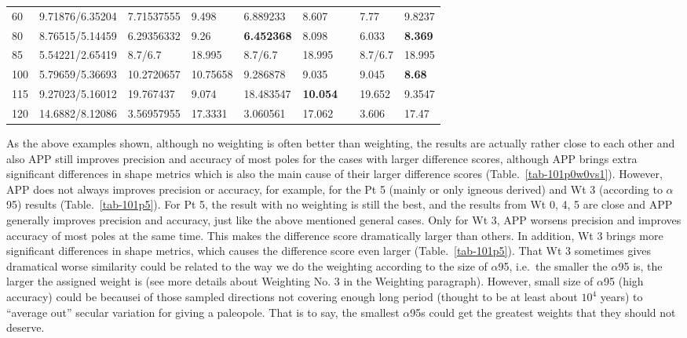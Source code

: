 \begin{table*}
\begin{tabular}{|l|l|l|l|l|l|l|l|l|l|}
60 & 9.71876/6.35204 & 7.71537555 & 9.498 & 6.889233 & 8.607 & \multicolumn{2}{l|}{} & 7.77 & 9.8237 \\ \cline{1-6} \cline{9-10} 
80 & 8.76515/5.14459 & 6.29356332 & 9.26 & \textbf{6.452368} & 8.098 & \multicolumn{2}{l|}{} & 6.033 & \textbf{8.369} \\ \cline{1-6} \cline{9-10} 
85 & 5.54221/2.65419 & 8.7/6.7 & 18.995 & 8.7/6.7 & 18.995 & \multicolumn{2}{l|}{} & 8.7/6.7 & 18.995 \\ \cline{1-6} \cline{9-10} 
100 & 5.79659/5.36693 & 10.2720657 & 10.75658 & 9.286878 & 9.035 & \multicolumn{2}{l|}{} & 9.045 & \textbf{8.68} \\ \cline{1-6} \cline{9-10} 
115 & 9.27023/5.16012 & 19.767437 & 9.074 & 18.483547 & \textbf{10.054} & \multicolumn{2}{l|}{} & 19.652 & 9.3547 \\ \cline{1-6} \cline{9-10} 
120 & 14.6882/8.12086 & 3.56957955 & 17.3331 & 3.060561 & 17.062 & \multicolumn{2}{l|}{} & 3.606 & 17.47 \\ \cline{1-6} \cline{9-10} 
\end{tabular}
\end{table*}

As the above examples shown, although no weighting is often better than
weighting, the results are actually rather close to each other and also APP
still improves precision and accuracy of most poles for the cases with larger
difference scores, although APP brings extra significant differences in shape
metrics which is also the main cause of their larger difference scores
(Table.~\ref{tab-101p0w0vs1}). However, APP does not always improves precision
or accuracy, for example, for the Pt 5 (mainly or only igneous derived) and Wt 3
(according to $\alpha$95) results (Table.~\ref{tab-101p5}). For Pt 5, the result
with no weighting is still the best, and the results from Wt 0, 4, 5
are close and APP generally improves precision and accuracy, just like the above
mentioned general cases. Only for Wt 3, APP worsens precision and improves
accuracy of most poles at the same time. This makes the difference score
dramatically larger than others. In addition, Wt 3 brings more significant
differences in shape metrics, which causes the difference score even larger
(Table.~\ref{tab-101p5}). That Wt 3 sometimes gives dramatical worse similarity
could be related to the way we do the weighting according to the size of
$\alpha$95, i.e.\, the smaller the $\alpha$95 is, the larger the assigned
weight is (see more details about Weighting No. 3 in the Weighting paragraph).
However, small size of $\alpha$95 (high accuracy) could be becausei of those
sampled directions not covering enough long period (thought to be at least about
$10^4$ years) to ``average out'' secular variation for giving a paleopole. That
is to say, the smallest $\alpha$95s could get the greatest weights that they
should not deserve.


